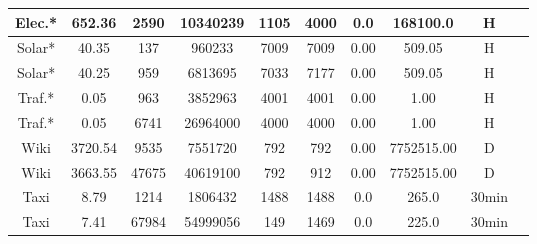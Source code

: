 \begin{table}[htb]
\begin{tabular}{c | c c c c c c c c c}
    Elec.*            & 652.36         & 2590             & 10340239        & 1105               & 4000              & 0.0           & 168100.0      & H               \\
    \hline
    Solar*            & 40.35          & 137              & 960233          & 7009               & 7009              & 0.00          & 509.05        & H               \\
    Solar*            & 40.25          & 959              & 6813695         & 7033               & 7177              & 0.00          & 509.05        & H               \\
    \hline
    Traf.*            & 0.05           & 963              & 3852963         & 4001               & 4001              & 0.00          & 1.00          & H               \\
    Traf.*            & 0.05           & 6741             & 26964000        & 4000               & 4000              & 0.00          & 1.00          & H               \\
    \hline
    Wiki              & 3720.54        & 9535             & 7551720         & 792                & 792               & 0.00          & 7752515.00    & D               \\
    Wiki              & 3663.55        & 47675            & 40619100        & 792                & 912               & 0.00          & 7752515.00    & D               \\
    \hline
    Taxi              & 8.79           & 1214             & 1806432         & 1488               & 1488              & 0.0           & 265.0         & 30min           \\
    Taxi              & 7.41           & 67984            & 54999056        & 149                & 1469              & 0.0           & 225.0         & 30min           \\

\end{tabular}
\end{table}
